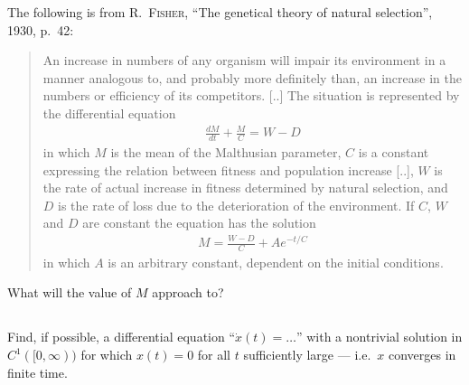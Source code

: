 \documentclass[12pt,a4paper]{article}
\begin{document}
    The following is from
    \textsc{R.~Fisher},
    ``The genetical theory of natural selection'', 1930, p.~42:
    
    \begin{quote}
        \small
        
        An increase in numbers of any organism
        will impair its environment
        in a manner analogous to,
        and probably more definitely than,
        an increase in the numbers or efficiency
        of its competitors.
        [..]
        The situation is represented by
        the differential equation
        \begin{align}
            \frac{d M}{d t} + \frac{M}{C} = W - D
        \end{align}
        in which
        $M$ is the mean of the Malthusian parameter,
        $C$ is a constant expressing the relation
        between fitness and population increase [..],
        $W$ is the rate of actual increase in fitness
        determined by natural selection,
        and $D$ is the rate of loss due to 
        the deterioration of the environment.
        If $C$, $W$ and $D$ are constant
        the equation has the solution
        \begin{align}
            M = \frac{W - D}{C} + A e^{-t / C}
        \end{align}
        in which $A$ is an arbitrary constant,
        dependent on the initial conditions.
    \end{quote}
    
    What will the value of $M$ approach to?
    

    
    \subsection{}
    
    Find, if possible,
    a differential equation ``$\dot{x}(t) = \ldots$''
    with a nontrivial solution in $C^1([0, \infty))$
    for which
    $x(t) = 0$ for all $t$ sufficiently large ---
    i.e.~$x$ converges in finite time.
    
    
    
    \subsection{}
    
\end{document}
